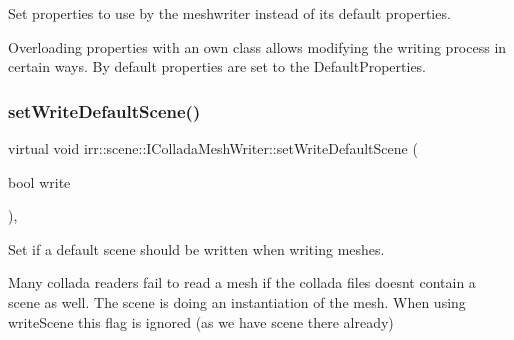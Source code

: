 Set properties to use by the meshwriter instead of it\textquotesingle{}s default properties. 

Overloading properties with an own class allows modifying the writing process in certain ways. By default properties are set to the Default\+Properties. \mbox{\label{classirr_1_1scene_1_1IColladaMeshWriter_acf1952c459b4b2bde5b479b6d9717c35}} 
\subsubsection{\texorpdfstring{set\+Write\+Default\+Scene()}{setWriteDefaultScene()}}
{\footnotesize\ttfamily virtual void irr\+::scene\+::\+I\+Collada\+Mesh\+Writer\+::set\+Write\+Default\+Scene (\begin{DoxyParamCaption}\item[{bool}]{write }\end{DoxyParamCaption})\hspace{0.3cm}{\ttfamily [inline]}, {\ttfamily [virtual]}}



Set if a default scene should be written when writing meshes. 

Many collada readers fail to read a mesh if the collada files doesn\textquotesingle{}t contain a scene as well. The scene is doing an instantiation of the mesh. When using write\+Scene this flag is ignored (as we have scene there already) \mbox{\label{classirr_1_1scene_1_1IColladaMeshWriter_ac9c48beab095aa6f4cb4f696bb2ecd45}} 

